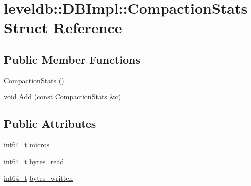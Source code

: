 \hypertarget{structleveldb_1_1_d_b_impl_1_1_compaction_stats}{\section{leveldb\-:\-:D\-B\-Impl\-:\-:Compaction\-Stats Struct Reference}
\label{structleveldb_1_1_d_b_impl_1_1_compaction_stats}
}
\subsection*{Public Member Functions}
\begin{DoxyCompactItemize}
\item 
\hyperlink{structleveldb_1_1_d_b_impl_1_1_compaction_stats_ab6367655de4bef0c2c2eb38c4a6c0b29}{Compaction\-Stats} ()
\item 
void \hyperlink{structleveldb_1_1_d_b_impl_1_1_compaction_stats_ae368f762a8b5d59e727faa94f393b7f0}{Add} (const \hyperlink{structleveldb_1_1_d_b_impl_1_1_compaction_stats}{Compaction\-Stats} \&c)
\end{DoxyCompactItemize}
\subsection*{Public Attributes}
\begin{DoxyCompactItemize}
\item 
\hyperlink{stdint_8h_adec1df1b8b51cb32b77e5b86fff46471}{int64\-\_\-t} \hyperlink{structleveldb_1_1_d_b_impl_1_1_compaction_stats_a7c64b7eadf84a5e4a5ff6482df7cefa1}{micros}
\item 
\hyperlink{stdint_8h_adec1df1b8b51cb32b77e5b86fff46471}{int64\-\_\-t} \hyperlink{structleveldb_1_1_d_b_impl_1_1_compaction_stats_a695c4b05f9ba991f2a5fa4fd801dbf53}{bytes\-\_\-read}
\item 
\hyperlink{stdint_8h_adec1df1b8b51cb32b77e5b86fff46471}{int64\-\_\-t} \hyperlink{structleveldb_1_1_d_b_impl_1_1_compaction_stats_a8a2b2fde9bec83da2a82b6981dfc036d}{bytes\-\_\-written}
\end{DoxyCompactItemize}


